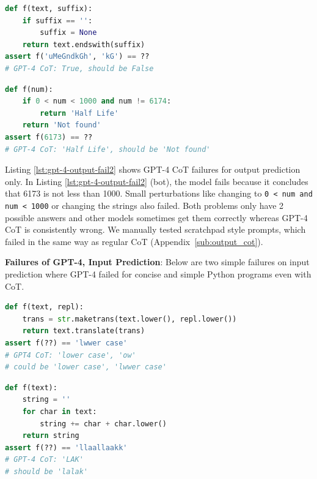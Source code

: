 \documentclass{article}
\theoremstyle{plain}
\theoremstyle{definition}
\theoremstyle{remark}
\begin{document}
\begin{minipage}{\columnwidth}
\begin{lstlisting}[caption={},label={lst:gpt-4-output-fail1}, breaklines=true, language=python]
def f(text, suffix):
    if suffix == '':
        suffix = None
    return text.endswith(suffix)
assert f('uMeGndkGh', 'kG') == ??
# GPT-4 CoT: True, should be False
\end{lstlisting}
\vspace{-1em}
\begin{lstlisting}[caption=GPT-4 CoT output failures,label={lst:gpt-4-output-fail2}, breaklines=true, language=python]
def f(num):
    if 0 < num < 1000 and num != 6174:
        return 'Half Life'
    return 'Not found'
assert f(6173) == ??
# GPT-4 CoT: 'Half Life', should be 'Not found'
\end{lstlisting}
\end{minipage}

Listing \ref{lst:gpt-4-output-fail2} shows GPT-4 CoT failures for output prediction only. In Listing \ref{lst:gpt-4-output-fail2} (bot), the model fails because it concludes that 6173 is not less than 1000. Small perturbations like changing to \texttt{0 < num and num < 1000} or changing the strings also failed. Both problems only have 2 possible answers and other models sometimes get them correctly whereas GPT-4 CoT is consistently wrong. We manually tested scratchpad \cite{nye2021show} style prompts, which failed in the same way as regular CoT (Appendix~\ref{sub:output_cot}). 


\textbf{Failures of GPT-4, Input Prediction}: Below are two simple failures on input prediction where GPT-4 failed for concise and simple Python programs even with CoT.

\begin{minipage}{\columnwidth}
\begin{lstlisting}[caption={},label={lst:gpt-4-input-fail1}, breaklines=true, language=python]
def f(text, repl):
    trans = str.maketrans(text.lower(), repl.lower())
    return text.translate(trans)
assert f(??) == 'lwwer case'
# GPT4 CoT: 'lower case', 'ow'
# could be 'lower case', 'lwwer case'
\end{lstlisting}
\vspace{-1em}
\begin{lstlisting}[caption={},label={lst:gpt-4-input-fail2}, breaklines=true, language=python]
def f(text):
    string = ''
    for char in text:
        string += char + char.lower()
    return string
assert f(??) == 'llaallaakk'
# GPT-4 CoT: 'LAK'
# should be 'lalak'
\end{lstlisting}
\end{minipage}
\end{document}
